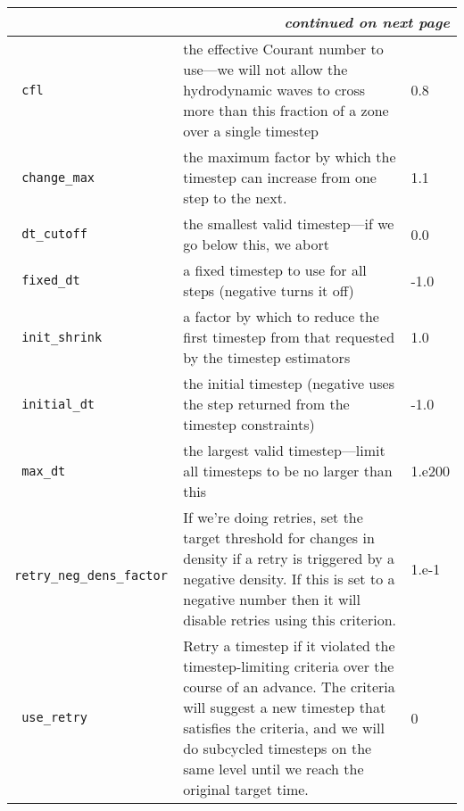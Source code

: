 \begin{landscape}
{\begin{center}
\begin{longtable}{|l|p{5.25in}|l|}
\multicolumn{3}{|r|}{{\em continued on next page}} \\ \hline
\endfoot

\hline 
\endlastfoot


\rowcolor{tableShade}
\verb= cfl = &  the effective Courant number to use---we will not allow the hydrodynamic waves to cross more than this fraction of a zone over a single timestep & 0.8 \\
\verb= change_max = &  the maximum factor by which the timestep can increase from one step to the next. & 1.1 \\
\rowcolor{tableShade}
\verb= dt_cutoff = &  the smallest valid timestep---if we go below this, we abort & 0.0 \\
\verb= fixed_dt = &  a fixed timestep to use for all steps (negative turns it off) & -1.0 \\
\rowcolor{tableShade}
\verb= init_shrink = &  a factor by which to reduce the first timestep from that requested by the timestep estimators & 1.0 \\
\verb= initial_dt = &  the initial timestep (negative uses the step returned from the timestep constraints) & -1.0 \\
\rowcolor{tableShade}
\verb= max_dt = &  the largest valid timestep---limit all timesteps to be no larger than this & 1.e200 \\
\verb= retry_neg_dens_factor = &  If we're doing retries, set the target threshold for changes in density if a retry is triggered by a negative density. If this is set to a negative number then it will disable retries using this criterion. & 1.e-1 \\
\rowcolor{tableShade}
\verb= use_retry = &  Retry a timestep if it violated the timestep-limiting criteria over the course of an advance. The criteria will suggest a new timestep that satisfies the criteria, and we will do subcycled timesteps on the same level until we reach the original target time. & 0 \\


\end{longtable}
\end{center}

} %


\end{landscape}

%



